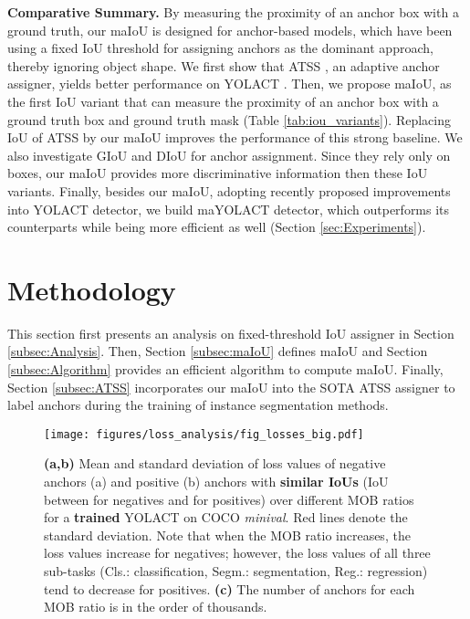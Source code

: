 \documentclass{bmvc2k}
\begin{document}
\noindent \textbf{Comparative Summary.} By measuring the proximity of an anchor box with a ground truth, our maIoU is designed for anchor-based models, which have been using a fixed IoU threshold for assigning anchors as the dominant approach, thereby ignoring  object shape. We first show that ATSS \cite{ATSS}, an adaptive anchor assigner, yields better performance on YOLACT \cite{yolact}. Then, we propose maIoU, as the first IoU variant that can measure the proximity of an anchor box with a ground truth box and ground truth mask (Table \ref{tab:iou_variants}). Replacing IoU of ATSS by our maIoU improves the performance of this strong baseline. We also investigate  GIoU and DIoU for anchor assignment. Since they rely only on boxes, our maIoU provides more discriminative information then these IoU variants. Finally, besides our maIoU, adopting recently proposed improvements into YOLACT detector, we build maYOLACT detector, which outperforms its counterparts while being more efficient as well (Section \ref{sec:Experiments}). \section{Methodology}
\label{sec:miou}

This section first presents an analysis on fixed-threshold IoU assigner in Section \ref{subsec:Analysis}. Then, Section \ref{subsec:maIoU} defines maIoU and Section \ref{subsec:Algorithm} provides an efficient algorithm to compute maIoU. Finally, Section \ref{subsec:ATSS} incorporates our maIoU into the SOTA ATSS assigner \cite{ATSS} to label  anchors during the training of instance segmentation methods.

\begin{figure}
    \centering
    \texttt{[image: figures/loss\_analysis/fig\_losses\_big.pdf]}
    \caption{\small \textbf{(a,b)} Mean and standard deviation of loss values of negative anchors (a) and positive (b) anchors with \textbf{similar IoUs} (IoU between  for negatives and  for positives) over different MOB ratios for a \textbf{trained} YOLACT on COCO \textit{minival}. Red lines denote the standard deviation. Note that when the MOB ratio increases, the loss values  increase for negatives; however,  the loss values of all three sub-tasks (Cls.: classification, Segm.: segmentation, Reg.: regression) tend to decrease for positives.
\textbf{(c)} The number of anchors for each MOB ratio is in the order of thousands.
    \label{fig:LossAnalysis}}
\end{figure}
\end{document}

